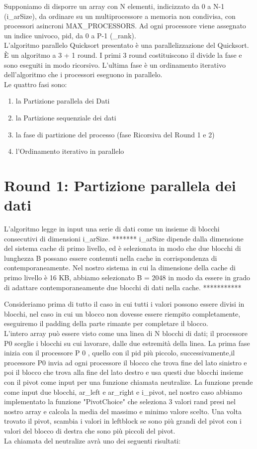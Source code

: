 Supponiamo di disporre un array con N elementi, indicizzato da 0 a N-1 (i\_arSize), da ordinare su un multiprocessore a memoria non condivisa, con processori asincroni MAX\_PROCESSORS. 
Ad ogni processore viene assegnato un indice univoco, pid, da 0 a P-1 (\_rank).\\
L'algoritmo parallelo Quicksort presentato è una parallelizzazione del Quicksort. È un algoritmo a 3 + 1 round. I primi 3 round costituiscono il divide la fase e sono eseguiti in modo ricorsivo. L'ultima fase è un ordinamento iterativo dell'algoritmo che i processori eseguono in parallelo.\\
Le quattro fasi sono:
\begin{enumerate}
\item la Partizione parallela dei Dati 
\item la Partizione sequenziale dei dati
\item la fase di partizione del processo (fase Ricorsiva del Round 1 e 2)
\item l'Ordinamento iterativo in parallelo 
\end{enumerate}
 
\section{Round 1: Partizione parallela dei dati}

L'algoritmo legge in input una serie di dati come un insieme di blocchi consecutivi di dimensioni i\_arSize. 
******* 
i\_arSize dipende dalla dimensione del sistema cache di primo livello, ed è selezionata in modo che due blocchi di lunghezza B possano essere contenuti nella cache in corrispondenza di contemporaneamente. Nel nostro sistema in cui la dimensione della cache di primo livello è 16 KB, abbiamo selezionato
B = 2048 in modo da essere in grado di adattare contemporaneamente due blocchi di dati nella cache. 
***********

Consideriamo prima di tutto il caso in cui tutti i valori possono essere divisi in blocchi, nel caso in cui un blocco non dovesse essere riempito completamente, eseguiremo il padding della parte rimante per completare il blocco. \\
L'intero array può essere visto come una linea di N blocchi di dati; il processore P0 sceglie i blocchi su cui lavorare, dalle due estremità della linea.
La prima fase inizia con il processore P 0 , quello con il pid più piccolo, successivamente,il processore P0 invia ad ogni processore il blocco che trova fine del lato sinistro e poi il blocco che trova alla fine del lato destro e usa questi due blocchi insieme con il pivot come input per una funzione chiamata neutralize. La funzione prende come input due blocchi, ar\_left e ar\_right e i\_pivot, nel nostro caso abbiamo implementato la funzione "PivotChoice" che seleziona 3 valori rand presi nel nostro array e calcola la media del massimo e minimo valore scelto. Una volta trovato il pivot, scambia i valori in leftblock se sono più grandi del pivot con i valori del blocco di destra che sono più piccoli del pivot. \\
La chiamata del neutralize avrà uno dei seguenti risultati:

